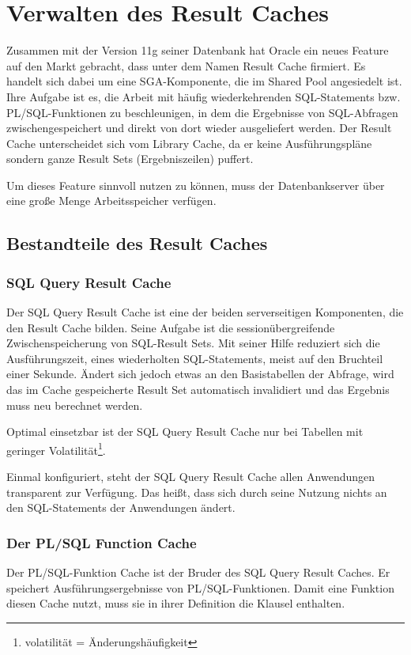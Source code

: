 \chapter{Verwalten des Result Caches}
\chaptertoc{}
\cleardoubleevenpage

    Zusammen mit der Version 11g seiner Datenbank hat Oracle ein neues Feature
    auf den Markt gebracht, dass unter dem Namen Result Cache firmiert. Es
    handelt sich dabei um eine SGA-Komponente, die im Shared Pool angesiedelt
    ist. Ihre Aufgabe ist es, die Arbeit mit häufig wiederkehrenden
    SQL-Statements bzw. PL/SQL-Funktionen zu beschleunigen, in dem die
    Ergebnisse von SQL-Abfragen zwischengespeichert und direkt von dort wieder
    ausgeliefert werden. Der Result Cache unterscheidet sich vom Library Cache,
    da er keine Ausführungspläne sondern ganze Result Sets (Ergebniszeilen)
    puffert.

    \begin{merke}
      Um dieses Feature sinnvoll nutzen zu können, muss der Datenbankserver über eine große Menge Arbeitsspeicher verfügen.
    \end{merke}
    \section{Bestandteile des Result Caches}
      \subsection{SQL Query Result Cache}
        Der SQL Query Result Cache ist eine der beiden serverseitigen Komponenten, die den Result Cache bilden. Seine Aufgabe ist die sessionübergreifende Zwischenspeicherung von SQL-Result Sets. Mit seiner Hilfe reduziert sich die Ausführungszeit, eines wiederholten SQL-Statements, meist auf den Bruchteil einer Sekunde. Ändert sich jedoch etwas an den Basistabellen der Abfrage, wird das im Cache gespeicherte Result Set automatisch invalidiert und das Ergebnis muss neu berechnet werden.
        \begin{merke}
          Optimal einsetzbar ist der SQL Query Result Cache nur bei Tabellen mit geringer Volatilität\footnote{volatilität = Änderungshäufigkeit}.
        \end{merke}

        Einmal konfiguriert, steht der SQL Query Result Cache allen Anwendungen transparent zur Verfügung. Das heißt, dass sich durch seine Nutzung nichts an den SQL-Statements der Anwendungen ändert.
      \subsection{Der PL/SQL Function Cache}
        Der PL/SQL-Funktion Cache ist der Bruder des SQL Query Result Caches. Er speichert Ausführungsergebnisse von PL/SQL-Funktionen. Damit eine Funktion diesen Cache nutzt, muss sie in ihrer Definition die Klausel  enthalten.
